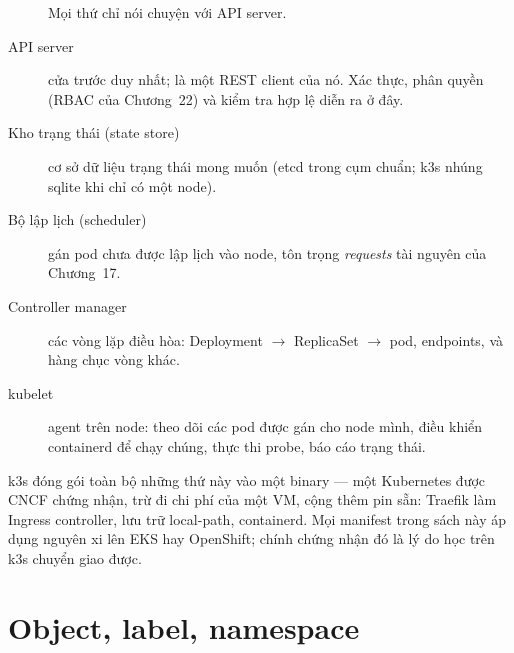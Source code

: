 \begin{figure}[h]
\centering
{}
\caption{Mọi thứ chỉ nói chuyện với API server.}
\end{figure}

\begin{description}
  \item[API server] cửa trước duy nhất;  là một REST
  client của nó. Xác thực, phân quyền (RBAC của Chương~22) và kiểm tra
  hợp lệ diễn ra ở đây.
  \item[Kho trạng thái (state store)] cơ sở dữ liệu trạng thái mong
  muốn (etcd trong cụm chuẩn; k3s nhúng sqlite khi chỉ có một node).
  \item[Bộ lập lịch (scheduler)] gán pod chưa được lập lịch vào node,
  tôn trọng \emph{requests} tài nguyên của Chương~17.
  \item[Controller manager] các vòng lặp điều hòa: Deployment
  $\rightarrow$ ReplicaSet $\rightarrow$ pod, endpoints, và hàng chục
  vòng khác.
  \item[kubelet] agent trên node: theo dõi các pod được gán cho node
  mình, điều khiển containerd để chạy chúng, thực thi probe, báo cáo
  trạng thái.
\end{description}

k3s đóng gói toàn bộ những thứ này vào một binary --- một Kubernetes
được CNCF chứng nhận, trừ đi chi phí của một VM, cộng thêm pin sẵn:
Traefik làm Ingress controller, lưu trữ local-path, containerd. Mọi
manifest trong sách này áp dụng nguyên xi lên EKS hay OpenShift; chính
chứng nhận đó là lý do học trên k3s chuyển giao được.

\section{Object, label, namespace}

